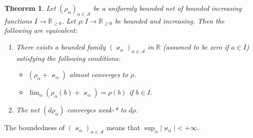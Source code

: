 \documentclass[12pt,b5paper,notitlepage]{article}
\theoremstyle{definition}
\theoremstyle{plain}
\newtheorem{thm}[df]{Theorem}
\newcommand{\scr}{\mathscr}
\newcommand{\Rbb}{\mathbb R}
\newcommand{\vkp}{\varkappa}
\numberwithin{equation}{section}
\begin{document}
\begin{thm}\label{lb92}
Let $(\rho_\alpha)_{\alpha\in\scr A}$ be a uniformly bounded net of bounded increasing functions $I\rightarrow\Rbb_{\geq0}$. Let $\rho:I\rightarrow\Rbb_{\geq0}$ be bounded and increasing. Then the following are equivalent:
\begin{enumerate}[label=(\alph*)]
\item There exists a bounded family $(\varkappa_\alpha)_{\alpha\in\scr A}$ in $\Rbb$ (assumed to be zero if $a\in I$) satisfying the following conditions:
\begin{itemize}
\item $(\rho_\alpha+\varkappa_\alpha)$ almost converges to $\rho$.
\item $\lim_\alpha(\rho_\alpha(b)+\varkappa_\alpha)=\rho(b)$ if $b\in I$.
\end{itemize}
\item The net $(d\rho_\alpha)$ converges weak-* to  $d\rho$.
\end{enumerate}
\end{thm}

The boundedness of $(\varkappa_\alpha)_{\alpha\in\scr A}$ means that $\sup_\alpha|\vkp_\alpha|<+\infty$.
\end{document}
